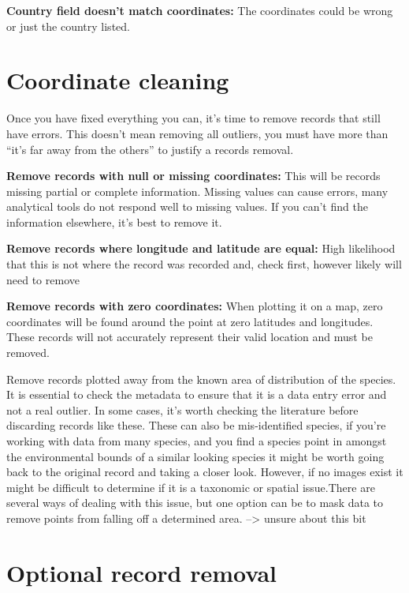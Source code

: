 \documentclass[
  letterpaper,
  DIV=11,
  numbers=noendperiod,
  oneside]{scrreprt}
\begin{document}
\textbf{Country field doesn't match coordinates:} The coordinates could
be wrong or just the country listed.

\hypertarget{coordinate-cleaning}{%
\section{Coordinate cleaning}\label{coordinate-cleaning}}

Once you have fixed everything you can, it's time to remove records that
still have errors. This doesn't mean removing all outliers, you must
have more than ``it's far away from the others'' to justify a records
removal.

\textbf{Remove records with null or missing coordinates:} This will be
records missing partial or complete information. Missing values can
cause errors, many analytical tools do not respond well to missing
values. If you can't find the information elsewhere, it's best to remove
it.

\textbf{Remove records where longitude and latitude are equal:} High
likelihood that this is not where the record was recorded and, check
first, however likely will need to remove

\textbf{Remove records with zero coordinates:} When plotting it on a
map, zero coordinates will be found around the point at zero latitudes
and longitudes. These records will not accurately represent their valid
location and must be removed.

Remove records plotted away from the known area of distribution of the
species. It is essential to check the metadata to ensure that it is a
data entry error and not a real outlier. In some cases, it's worth
checking the literature before discarding records like these. These can
also be mis-identified species, if you're working with data from many
species, and you find a species point in amongst the environmental
bounds of a similar looking species it might be worth going back to the
original record and taking a closer look. However, if no images exist it
might be difficult to determine if it is a taxonomic or spatial
issue.There are several ways of dealing with this issue, but one option
can be to mask data to remove points from falling off a determined area.
--\textgreater{} unsure about this bit

\hypertarget{optional-record-removal}{%
\section{Optional record removal}\label{optional-record-removal}}
\end{document}
